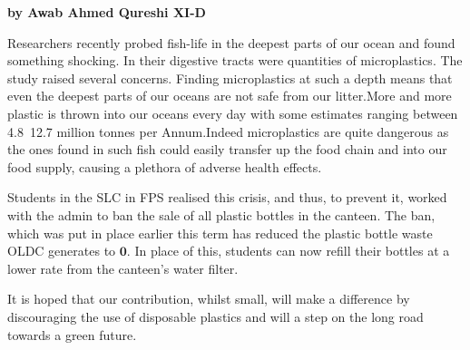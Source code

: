 \documentclass{article}
\date{\today}
\begin{document}
\maketitle
\large 



\textbf{by Awab Ahmed Qureshi XI-D}

Researchers recently probed fish-life in the deepest parts of our ocean and found something shocking. In their digestive tracts were quantities of microplastics. The study raised several concerns. Finding microplastics at such a depth means that even the deepest parts of our oceans are not safe from our litter.More and more plastic is thrown into our oceans every day with some estimates ranging between 4.8~12.7 million tonnes per Annum.\newline Indeed microplastics are quite dangerous as the ones found in such fish could easily transfer up the food chain and into our food supply, causing a plethora of adverse health effects.

Students in the SLC in FPS realised this crisis, and thus, to prevent it, worked with the admin to ban the sale of all plastic bottles in the canteen. The ban, which was put in place earlier this term has reduced the plastic bottle waste OLDC generates to $\boldsymbol{0}$. In place of this, students can now refill their bottles at a lower rate from the canteen's water filter.

It is hoped that our contribution, whilst small, will make a difference by discouraging the use of disposable plastics and will a step on the long road towards a green future. 


\closearticle
\end{document}
